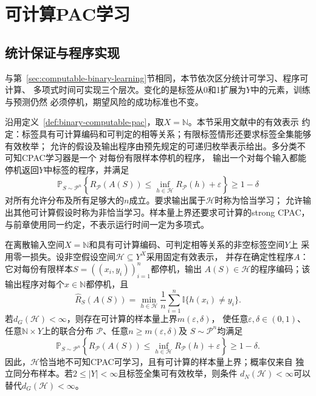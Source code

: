 \section{可计算PAC学习}
\label{sec:computable-multiclass-learning}

\subsection{统计保证与程序实现}

与第~\ref{sec:computable-binary-learning}节相同，本节依次区分统计可学习、程序可计算、
多项式时间可实现三个层次。变化的是标签从0和1扩展为$Y$中的元素，训练与预测仍然
必须停机，期望风险的成功标准也不变。

沿用定义~\ref{def:binary-computable-pac}，取$X=\mathbb N$。本节采用文献中的有效表示
约定：标签具有可计算编码和可判定的相等关系；有限标签情形还要求标签全集能够有效枚举；
允许的假设及输出程序由预先规定的可递归枚举表示给出。多分类不可知CPAC学习器是一个
对每份有限样本停机的程序，
输出一个对每个输入都能停机返回$Y$中标签的程序，并满足
\[
 \mathbb P_{S\sim\mathcal P^n}\!\left\{
 R_{\mathcal P}(A(S))\leq\inf_{h\in\mathcal H}R_{\mathcal P}(h)+\varepsilon
 \right\}\geq1-\delta
\]
对所有允许分布及所有足够大的$n$成立。要求输出属于$\mathcal H$时称为恰当学习；
允许输出其他可计算假设时称为非恰当学习。样本量上界还要求可计算的strong CPAC，
与前章使用同一约定，不表示运行时间一定为多项式。

\begin{theorem}[多分类可计算ERM的充分条件]
\label{thm:multiclass-computable-erm}
在离散输入空间$X=\mathbb N$和具有可计算编码、可判定相等关系的非空标签空间$Y$上
采用零一损失。设非空假设空间$\mathcal H\subseteq Y^X$采用固定有效表示，
并存在确定性程序$A$：它对每份有限样本$S=((x_i,y_i))_{i=1}^n$都停机，输出
$A(S)\in\mathcal H$的程序编码；该输出程序对每个$x\in\mathbb N$都停机，且
\[
 \hat R_S(A(S))
 =\min_{h\in\mathcal H}\frac1n\sum_{i=1}^n\mathbb I\{h(x_i)\neq y_i\}.
\]
若$d_G(\mathcal H)<\infty$，则存在可计算的样本量上界$m(\varepsilon,\delta)$，
使任意$\varepsilon,\delta\in(0,1)$、任意$\mathbb N\times Y$上的联合分布
$\mathcal P$、任意$n\geq m(\varepsilon,\delta)$及
$S\sim\mathcal P^n$均满足
\[
 \mathbb P_{S\sim\mathcal P^n}\left\{
 R_{\mathcal P}(A(S))
 \leq\inf_{h\in\mathcal H}R_{\mathcal P}(h)+\varepsilon
 \right\}\geq1-\delta.
\]
因此，$\mathcal H$恰当地不可知CPAC可学习，且有可计算的样本量上界；概率仅来自
独立同分布样本。若$2\leq|Y|<\infty$且标签全集可有效枚举，则条件
$d_N(\mathcal H)<\infty$可以替代$d_G(\mathcal H)<\infty$。
\end{theorem}

